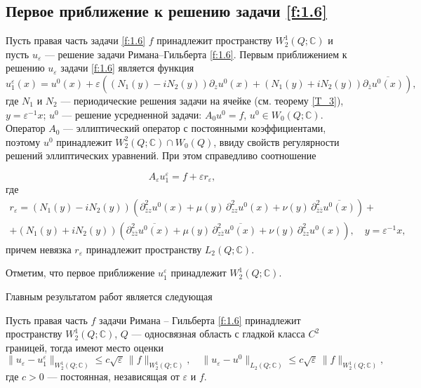 \subsection{Первое приближение к решению задачи  \eqref{f:1.6}}
Пусть правая часть задачи \eqref{f:1.6} $f$ принадлежит пространству $W_2^1(Q;\mathbb{C})$
и пусть $u_\varepsilon$ --- решение задачи Римана--Гильберта \eqref{f:1.6}.
Первым приближением к решению $u_\varepsilon$  задачи  \eqref{f:1.6} является функция
\begin{equation}\label{f:1.15}
u_1^\varepsilon(x)=u^0(x)+\varepsilon\left(\left(N_1(y)-iN_2(y)\right)\partial_zu^0(x)+\left(N_1(y)+iN_2(y)\right)\partial_{\bar{z}}\overline{u^0(x)}\right),
\end{equation}
где $N_1$ и $N_2$ --- периодические решения задачи на ячейке (см. теорему \ref{T_3}),
$y=\varepsilon^{-1}x$; $u^0$ --- решение усредненной задачи: $A_0u^0=f$, $u^0\in W_0(Q;\mathbb{C})$. Оператор $A_0$ --- эллиптический оператор с постоянными коэффициентами,
поэтому $u^0$ принадлежит $W_2^2(Q;\mathbb{C})\cap W_0(Q)$, ввиду свойств регулярности решений эллиптических уравнений.
При этом справедливо соотношение

\begin{equation}\label{f:1.17}
   A_{\varepsilon}u_1^{\varepsilon}=f+\varepsilon r_\varepsilon,
\end{equation}
где
\begin{multline*}
r_\varepsilon=\left(N_1(y)-iN_2(y)\right)
\left(\partial^2_{\bar{z}z}u^0(x)+\mu(y)\,\partial^2_{zz}u^0(x)+\nu(y)\,\partial^2_{\bar{z}\bar{z}}\overline{u^0(x)
}\right)+\\
+\left(N_1(y)+iN_2(y)\right)
\left(\partial^2_{\bar{z}\bar{z}}\overline{u^0(x)}+\mu(y)\,\partial^2_{z\bar{z}}\overline{u^0(x)}+
\nu(y)\,\partial^2_{\bar{z}z}u^0(x)
\right),\quad y=\varepsilon^{-1}x,
\end{multline*}
причем невязка $r_\varepsilon$ принадлежит пространству $L_2(Q;\mathbb{C})$.

Отметим, что первое приближение $u_1^\varepsilon$ принадлежит $W^1_2(Q;\mathbb{C})$.

Главным результатом работ \cite{1,2} является  следующая
\begin{theorem}\label{T_4}
Пусть правая часть $f$ задачи Римана -- Гильберта \eqref{f:1.6} принадлежит пространству $W^1_2(Q;\mathbb{C})$,  $Q$ --- односвязная область с гладкой класса $C^2$ границей, тогда имеют место оценки
\begin{equation}\label{f:1.16}
\|u_\varepsilon-u_1^\varepsilon\|_{W^1_2(Q;\mathbb{C})}\leqslant c\sqrt{\varepsilon}\,\|f\|_{W^1_2(Q;\mathbb{C})},\quad
\|u_\varepsilon-u^0\|_{L_2(Q;\mathbb{C})}\leqslant c\sqrt{\varepsilon}\,\|f\|_{W^1_2(Q;\mathbb{C})},
\end{equation}
где $c>0$ --- постоянная, независящая от $\varepsilon$ и $f$.
\end{theorem}


